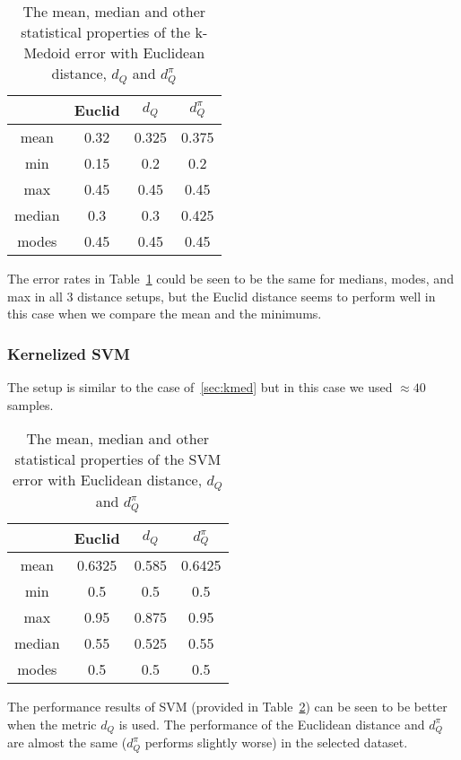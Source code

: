 \documentclass[11pt,a4paper,twocolumn]{article}%
\newcommand{\DQ}{d_Q}
\newcommand{\DQPi}{\ensuremath{d_Q^{\pi}}}
\begin{document}
    \begin{table}[!htbp]
        \label{tbl:kmed}
		\centering
		\begin{tabular}{|c|c|c|c|}
		    \hline
			 & Euclid & $\DQ$ & $\DQPi$\\ 
			\hline\hline
			mean & 0.32 & 0.325 & 0.375 \\ \hline
			min & 0.15 & 0.2 & 0.2 \\ \hline
			max & 0.45 & 0.45 & 0.45 \\ \hline
			median & 0.3 & 0.3 & 0.425 \\ \hline
			modes & 0.45 & 0.45 & 0.45 \\ \hline
		\end{tabular}
        \caption{The mean, median and other statistical properties of the k-Medoid error with Euclidean distance, $\DQ$ and $\DQPi$}
	\end{table}
	
The error rates in Table~\ref{tbl:kmed} could be seen to be the same for medians, modes, and max in all 3 distance setups, but the Euclid distance seems to perform well in this case when we compare the mean and the minimums.

\subsubsection{Kernelized SVM} \label{sec:svm}

The setup is similar to the case of~\ref{sec:kmed} but in this case we used $\approx 40$ samples.

    \begin{table}[!htbp]
        \label{tbl:SVM}
		\centering
		\begin{tabular}{|c|c|c|c|}
		    \hline
			 & Euclid & $\DQ$ & $\DQPi$\\ 
			\hline\hline
			mean & 0.6325 & 0.585 & 0.6425 \\ \hline
			min & 0.5 & 0.5 & 0.5 \\ \hline
			max & 0.95 & 0.875 & 0.95 \\ \hline
			median & 0.55 & 0.525 & 0.55 \\ \hline
			modes & 0.5 & 0.5 & 0.5 \\ \hline
		\end{tabular}
        \caption{The mean, median and other statistical properties of the SVM error with Euclidean distance, $\DQ$ and $\DQPi$}
	\end{table}

The performance results of SVM (provided in Table~\ref{tbl:SVM}) can be seen to be better when the metric $\DQ$ is used. The performance of the Euclidean distance and $\DQPi$ are almost the same ($\DQPi$ performs slightly worse) in the selected dataset.	
\end{document}
